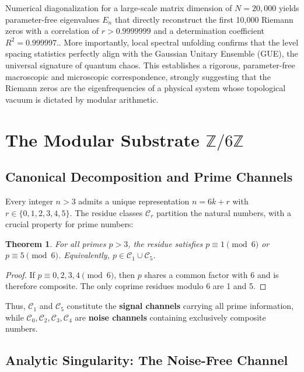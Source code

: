 \documentclass[prl,aps,floatfix,superscriptaddress,10pt]{revtex4-2}
\newtheorem{theorem}{Theorem}[section]
\begin{document}
Numerical diagonalization for a large-scale matrix dimension of $N=20,000$ yields parameter-free eigenvalues $E_n$ that directly reconstruct the first 10,000 Riemann zeros with a correlation of $r > 0.9999999$ and a determination coefficient $R^2 = 0.999997$.. More importantly, local spectral unfolding confirms that the level spacing statistics perfectly align with the Gaussian Unitary Ensemble (GUE), the universal signature of quantum chaos. This establishes a rigorous, parameter-free macroscopic and microscopic correspondence, strongly suggesting that the Riemann zeros are the eigenfrequencies of a physical system whose topological vacuum is dictated by modular arithmetic.


\section{The Modular Substrate \texorpdfstring{$\mathbb{Z}/6\mathbb{Z}$}{Z/6Z}}

\subsection{Canonical Decomposition and Prime Channels}

Every integer $n > 3$ admits a unique representation $n = 6k + r$ with $r \in \{0,1,2,3,4,5\}$.
The residue classes $\mathcal{C}_r$ partition the natural numbers, with a crucial property for prime numbers:

\begin{theorem}
For all primes $p > 3$, the residue satisfies $p \equiv 1 \pmod 6$ or $p \equiv 5 \pmod 6$.
Equivalently, $p \in \mathcal{C}_1 \cup \mathcal{C}_5$.
\end{theorem}

\begin{proof}
If $p \equiv 0,2,3,4 \pmod 6$, then $p$ shares a common factor with 6 and is therefore composite.
The only coprime residues modulo 6 are 1 and 5.
\end{proof}

Thus, $\mathcal{C}_1$ and $\mathcal{C}_5$ constitute the \textbf{signal channels} carrying all prime information, while $\mathcal{C}_0,\mathcal{C}_2,\mathcal{C}_3,\mathcal{C}_4$ are \textbf{noise channels} containing exclusively composite numbers.

\subsection{Analytic Singularity: The Noise-Free Channel}
\end{document}

